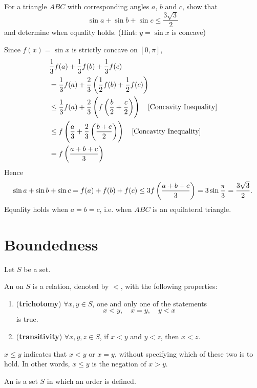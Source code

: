 \begin{exercise}{}{}
For a triangle $ABC$ with corresponding angles $a$, $b$ and $c$, show that
\[ \sin a+\sin b+\sin c\le\frac{3\sqrt{3}}{2} \]
and determine when equality holds. (Hint: $y=\sin x$ is concave)
\end{exercise}

\begin{solution}
Since $f(x)=\sin x$ is strictly concave on $[0,\pi]$,
\begin{align*}
&\frac{1}{3}f(a)+\frac{1}{3}f(b)+\frac{1}{3}f(c) \\
&= \frac{1}{3}f(a)+\frac{2}{3}\left(\frac{1}{2}f(b)+\frac{1}{2}f(c)\right) \\
&\le \frac{1}{3}f(a)+\frac{2}{3}\left(f\left(\frac{b}{2}+\frac{c}{2}\right)\right) \quad \text{[Concavity Inequality]} \\
&\le f\left(\frac{a}{3}+\frac{2}{3}\left(\frac{b+c}{2}\right)\right) \quad \text{[Concavity Inequality]} \\
&= f\left(\frac{a+b+c}{3}\right)
\end{align*}
Hence 
\[ \sin a+\sin b+\sin c=f(a)+f(b)+f(c)\le3f\left(\frac{a+b+c}{3}\right)=3\sin\frac{\pi}{3}=\frac{3\sqrt{3}}{2}. \]
Equality holds when $a=b=c$, i.e. when $ABC$ is an equilateral triangle.
\end{solution}
\pagebreak

\section{Boundedness}
Let $S$ be a set.
\begin{definition}[Order]
An  on $S$ is a relation, denoted by $<$, with the following properties:
\begin{enumerate}[label=(\roman*)]
\item (\textbf{trichotomy}) $\forall x,y \in S$, one and only one of the statements
\[ x<y, \quad x=y, \quad y<x \]
is true.
\item (\textbf{transitivity}) $\forall x,y,z \in S$, if $x<y$ and $y<z$, then $x<z$.
\end{enumerate}
\end{definition}

\begin{notation}
$x \le y$ indicates that $x<y$ or $x=y$, without specifying which of these two is to hold. In other words, $x\le y$ is the negation of $x>y$.
\end{notation}

\begin{definition}
An  is a set $S$ in which an order is defined.
\end{definition}

